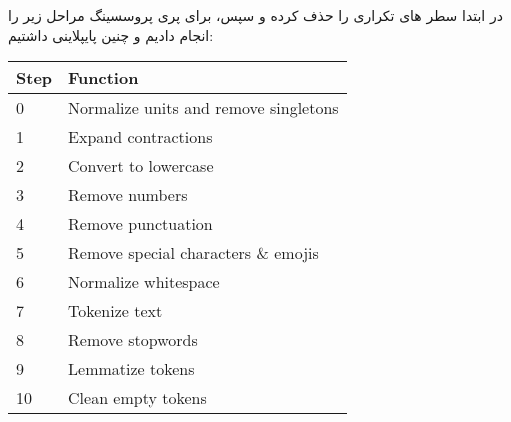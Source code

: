 \documentclass[a4paper,12pt]{article}
\begin{document}
در ابتدا سطر های تکراری را حذف کرده و سپس، برای پری پروسسینگ مراحل زیر را انجام دادیم و چنین پایپلاینی داشتیم:
\begin{latin}
	\begin{table}[H]
		\centering
		\begin{tabular}{|l|l|}
			\hline
			\textbf{Step} & \textbf{Function} \\
			\hline
			0 & Normalize units and remove singletons \\
			\hline
			1 & Expand contractions \\
			\hline
			2 & Convert to lowercase \\
			\hline
			3 & Remove numbers \\
			\hline
			4 & Remove punctuation \\
			\hline
			5 & Remove special characters \& emojis \\
			\hline
			6 & Normalize whitespace \\
			\hline
			7 & Tokenize text \\
			\hline
			8 & Remove stopwords \\
			\hline
			9 & Lemmatize tokens \\
			\hline
			10 & Clean empty tokens \\
			\hline
		\end{tabular}
		\label{tab:preprocessing_steps}
	\end{table}
\end{latin}
\end{document}
